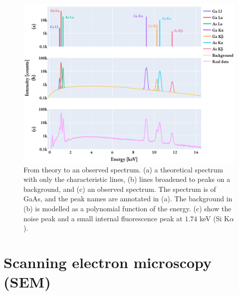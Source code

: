 \begin{figure}[hbtp]
    \centering
    \includegraphics[width=0.99\linewidth]{figures/eds_theoretical2realSpectrum.pdf}
    \caption{
        From theory to an observed spectrum.
        (a) a theoretical spectrum with only the characteristic lines, (b) lines broadened to peaks on a background, and (c) an observed spectrum.
        The spectrum is of GaAs, and the peak names are annotated in (a).
        The background in (b) is modelled as a polynomial function of the energy.
        (c) show the noise peak and a small internal fluorescence peak at $1.74$ keV (Si K$\alpha$).
    }
    \label{fig:eds_theoretical2realSpectrum}

\end{figure}


%



























\clearpage

\section{Scanning electron microscopy (SEM)}
\label{theory:sem}

